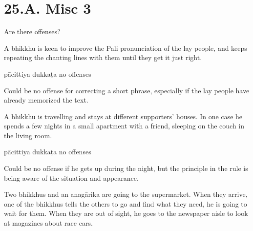 \chapter{25.A. Misc 3}
\renewcommand*{\theChapterTitle}{25.A. Misc 3}

\begin{exam}{\autoExamName}

  \begin{problem*}

    Are there offenses?

    \begin{parts}

      \item A bhikkhu is keen to improve the Pali pronunciation of the lay
      people, and keeps repeating the chanting lines with them until they get it
      just right.

      \bigskip

      \begin{answers}{3}
        \bChoices
         pācittiya\eAns
         dukkaṭa\eAns
         no offenses\eAns
        \eChoices
      \end{answers}

      \begin{solution}
        Could be no offense for correcting a short phrase, especially if the lay people have already memorized the text.
      \end{solution}

      \bigskip

      \item A bhikkhu is travelling and stays at different supporters' houses.
      In one case he spends a few nights in a small apartment with a friend,
      sleeping on the couch in the living room.

      \bigskip

      \begin{answers}{3}
        \bChoices
         pācittiya\eAns
         dukkaṭa\eAns
         no offenses\eAns
        \eChoices
      \end{answers}

      \begin{solution}
        Could be no offense if he gets up during the night, but the principle in
        the rule is being aware of the situation and appearance.
      \end{solution}

      \bigskip

      \item Two bhikkhus and an anagārika are going to the supermarket. When
      they arrive, one of the bhikkhus tells the others to go and find what they
      need, he is going to wait for them. When they are out of sight, he goes to
      the newspaper aisle to look at magazines about race cars.


\end{parts}
\end{problem*}
\end{exam}
